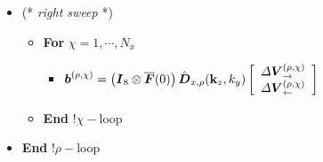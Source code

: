 \begin{figure}
{\begin{minipage} {140.0mm}
\begin{itemize}
\item (* {\em right sweep\/} *)

\begin{itemize}
\item {\bf  For} $\chi=1,\cdots,N_x$
\begin{itemize}
\item $
{\mbox{\boldmath$\mit b$\unboldmath}}^{(\rho,\chi)}=
\left({\mbox{\boldmath$\mit I$\unboldmath}}_8\otimes \overline{\mbox{\boldmath$\mit F$\unboldmath}}(0)  \right)
 \hat{\mbox{\boldmath$\mit D$\unboldmath}}_{x,\rho}({\bf k}_{z},{k}_{y})
 \left[\begin{array}{c}
{\mit \Delta}{\mbox{\boldmath$\mit V$\unboldmath}}^{(\rho,\chi)}_{\rightarrow}\\
{\mit \Delta}{\mbox{\boldmath$\mit V$\unboldmath}}^{(\rho,\chi)}_{\leftarrow}
\end{array}\right]
$

\end{itemize}
\item {\bf  End} !$\chi-$loop
\end{itemize}

\item {\bf  End} !$\rho-$loop

\end{itemize}

\vspace{2 mm}
\end{minipage}
}
\end{figure}

